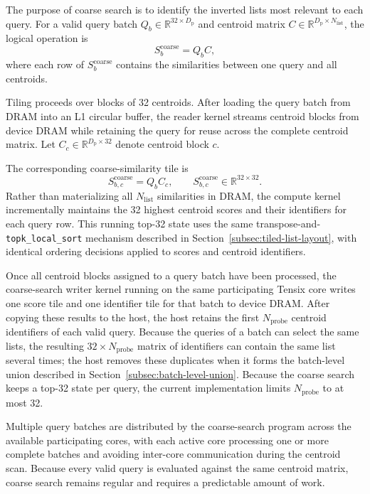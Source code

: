 The purpose of coarse search is to identify the inverted lists most relevant to each query. For a valid query batch \(Q_b\in\mathbb{R}^{32\times D_{\mathrm{p}}}\) and centroid matrix \(C\in\mathbb{R}^{D_{\mathrm{p}}\times N_{\mathrm{list}}}\), the logical operation is
\begin{equation}
S^{\mathrm{coarse}}_b=Q_bC,
\label{eq:coarse-search}
\end{equation}
where each row of \(S^{\mathrm{coarse}}_b\) contains the similarities between one query and all centroids.

Tiling proceeds over blocks of 32 centroids. After loading the query batch from DRAM into an L1 circular buffer, the reader kernel streams centroid blocks from device DRAM while retaining the query for reuse across the complete centroid matrix. Let \(C_c\in\mathbb{R}^{D_{\mathrm{p}}\times32}\) denote centroid block \(c\).

The corresponding coarse-similarity tile is
\begin{equation}
S^{\mathrm{coarse}}_{b,c}=Q_bC_c,
\qquad
S^{\mathrm{coarse}}_{b,c}\in\mathbb{R}^{32\times32}.
\label{eq:coarse-similarity-tile}
\end{equation}
Rather than materializing all \(N_{\mathrm{list}}\) similarities in DRAM, the compute kernel incrementally maintains the 32 highest centroid scores and their identifiers for each query row. This running top-32 state uses the same transpose-and-\texttt{topk\_local\_sort} mechanism described in Section~\ref{subsec:tiled-list-layout}, with identical ordering decisions applied to scores and centroid identifiers.

Once all centroid blocks assigned to a query batch have been processed, the coarse-search writer kernel running on the same participating Tensix core writes one score tile and one identifier tile for that batch to device DRAM. After copying these results to the host, the host retains the first \(N_{\mathrm{probe}}\) centroid identifiers of each valid query. Because the queries of a batch can select the same lists, the resulting \(32\times N_{\mathrm{probe}}\) matrix of identifiers can contain the same list several times; the host removes these duplicates when it forms the batch-level union described in Section~\ref{subsec:batch-level-union}. Because the coarse search keeps a top-32 state per query, the current implementation limits \(N_{\mathrm{probe}}\) to at most 32.

Multiple query batches are distributed by the coarse-search program across the available participating cores, with each active core processing one or more complete batches and avoiding inter-core communication during the centroid scan. Because every valid query is evaluated against the same centroid matrix, coarse search remains regular and requires a predictable amount of work.

